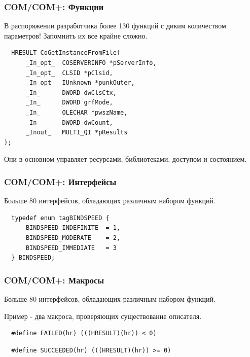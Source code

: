 \documentclass{beamer}
\begin{document}

\begin{frame}[fragile]
\frametitle{COM/COM+: Функции}

В распоряжении разработчика более 130 функций с диким количеством параметров! Запомнить их все крайне сложно.

\begin{verbatim}
  HRESULT CoGetInstanceFromFile(
      _In_opt_  COSERVERINFO *pServerInfo,
      _In_opt_  CLSID *pClsid,
      _In_opt_  IUnknown *punkOuter,
      _In_      DWORD dwClsCtx,
      _In_      DWORD grfMode,
      _In_      OLECHAR *pwszName,
      _In_      DWORD dwCount,
      _Inout_   MULTI_QI *pResults
);
\end{verbatim}

Они в основном управляет ресурсами, библиотеками, доступом и состоянием.

\end{frame}


\begin{frame}[fragile]
\frametitle{COM/COM+: Интерфейсы}

Больше 80 интерфейсов, обладающих различным набором функций.
\medskip

\begin{verbatim}
  typedef enum tagBINDSPEED { 
      BINDSPEED_INDEFINITE  = 1,
      BINDSPEED_MODERATE    = 2,
      BINDSPEED_IMMEDIATE   = 3
  } BINDSPEED;
\end{verbatim}

\end{frame}


\begin{frame}[fragile]
\frametitle{COM/COM+: Макросы}

Больше 80 интерфейсов, обладающих различным набором функций.
\medskip

Пример - два макроса, проверяющих существование описателя.
\begin{verbatim}
  #define FAILED(hr) (((HRESULT)(hr)) < 0)
\end{verbatim}

\begin{verbatim}
  #define SUCCEEDED(hr) (((HRESULT)(hr)) >= 0)
\end{verbatim}

\end{frame}
\end{document}

